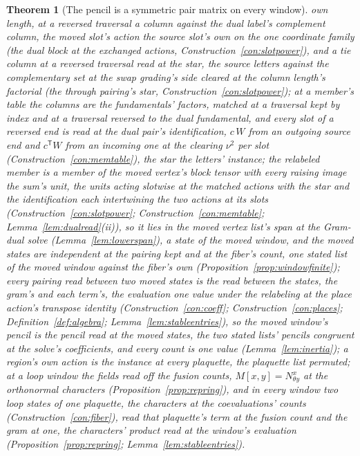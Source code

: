 \documentclass[11pt]{article}
\newtheorem{theorem}{Theorem}
\theoremstyle{definition}
\begin{document}
\begin{theorem}[The pencil is a symmetric pair matrix on every window]
own length, at a reversed traversal a column against the dual
label's complement column, the moved slot's action the source
slot's own on the one coordinate family (the dual block at the
exchanged actions, Construction~\ref{con:slotpower}), and a tie
column at a reversed traversal read at the star, the source
letters against the complementary set at the swap grading's side
cleared at the column length's factorial (the through pairing's
star, Construction~\ref{con:slotpower}); at a member's table the
columns are the fundamentals' factors, matched at a traversal kept
by index and at a traversal reversed to the dual fundamental, and
every slot of a reversed end is read at the dual pair's
identification, $c\,W$ from an outgoing source end and
$c^{\mathsf T}W$ from an incoming one at the clearing $\nu^{2}$
per slot (Construction~\ref{con:memtable}), the star the letters'
instance; the relabeled member is a
member of the moved vertex's block tensor with every raising image
the sum's unit, the units acting slotwise at the matched actions
with the star and the identification each intertwining the two
actions at its slots (Construction~\ref{con:slotpower};
Construction~\ref{con:memtable}; Lemma~\ref{lem:dualread}(ii)),
so it lies in the moved vertex list's span at the Gram-dual solve
(Lemma~\ref{lem:lowerspan}), a state of the moved window, and the
moved states are independent at the pairing kept and at the
fiber's count, one stated list of the moved window against the
fiber's own (Proposition~\ref{prop:windowfinite}); every pairing
read between two moved states is the read between the states, the
gram's and each term's, the evaluation one value under the
relabeling at the place action's transpose identity
(Construction~\ref{con:coeff}; Construction~\ref{con:places};
Definition~\ref{def:algebra}; Lemma~\ref{lem:stableentries}), so
the moved window's pencil is the pencil read at the moved states,
the two stated lists' pencils congruent at the solve's
coefficients, and every count is one value
(Lemma~\ref{lem:inertia}); a region's own action is the instance
at every plaquette, the plaquette list permuted; at a loop
window the fields read off the fusion counts, $M[x,y]=N^x_{\theta y}$
at the orthonormal characters (Proposition~\ref{prop:repring}), and
in every window two loop states of one plaquette, the characters
at the coevaluations' counts (Construction~\ref{con:fiber}), read
that plaquette's term at the fusion count and the gram at one, the
characters' product read at the window's evaluation
(Proposition~\ref{prop:repring}; Lemma~\ref{lem:stableentries}).
\end{theorem}
\end{document}
